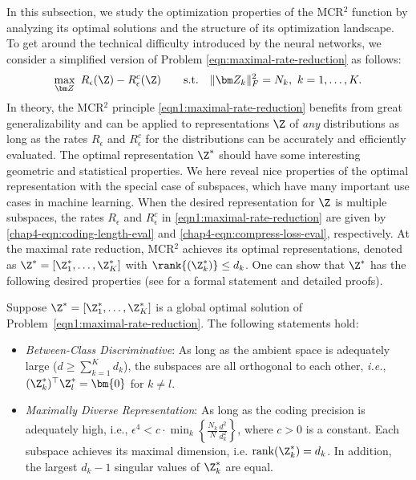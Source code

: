 \documentclass[../../book-main.tex]{subfiles}
\begin{document}
In this subsection, we study the optimization properties of the MCR$^2$ function by analyzing its optimal solutions and the structure of its optimization landscape. To get around the technical difficulty introduced by the neural networks, we consider a simplified version of Problem \eqref{eqn:maximal-rate-reduction} as follows: 
\begin{align}\label{eqn1:maximal-rate-reduction}
    \max_{\bm Z}\ R_{\epsilon}(\Z) - R_{\epsilon}^c(\Z)\qquad \mathrm{s.t.}\quad \|\bm Z_k\|_F^2 = N_k,\ k =1,\dots,K. 
\end{align}
In theory, the MCR$^2$ principle \eqref{eqn1:maximal-rate-reduction} benefits from great generalizability and can be applied to representations $\Z$ of {\em any} distributions  as long as the rates $R_\epsilon$ and $R^c_\epsilon$ for the distributions can be accurately and efficiently evaluated. The optimal representation $\Z^{\ast}$  should have some interesting geometric and statistical properties. We here reveal nice properties of the optimal representation with the special case of subspaces, which have many important use cases in machine learning. When the desired representation for $\Z$ is multiple subspaces, the rates $R_\epsilon$ and $R^c_\epsilon$ in \eqref{eqn1:maximal-rate-reduction} are given by \eqref{chap4-eqn:coding-length-eval}
and \eqref{chap4-eqn:compress-loss-eval}, respectively. At the maximal rate reduction, MCR$^2$ achieves its optimal representations, denoted as $\Z^{\ast} = [\Z_1^*,\dots,\Z_K^*]$ with $\rank{(\Z_{k}^*)}\le d_k$. One can show that $\Z^{\ast}$ has the following desired properties (see \cite{yu2020learning} for a formal statement and detailed proofs).

\begin{theorem}
	Suppose $\Z^{\ast} = [\Z_1^*,\dots,\Z_K^*]$ is a global optimal solution of Problem~\eqref{eqn1:maximal-rate-reduction}. The following statements hold: 
	\begin{itemize}
		\item {\em Between-Class Discriminative}: As long as the ambient space is adequately large ($d \ge \sum_{k=1}^{K} d_k$), the subspaces are all orthogonal to each other, {\em i.e.}, $(\Z_{k}^*)^{\top} \Z_{l}^* = \bm{0}$ for $k \not= l$.
		\item {\em Maximally Diverse Representation}:
		      As long as the coding precision is adequately high, i.e., $\epsilon ^4 < c\cdot \min_{k}\left\{ \frac{N_k}{N}\frac{d^2}{d_k^2}\right\}$, where $c>0$ is a constant. Each subspace achieves its maximal dimension, i.e. $\mathrm{rank}{(\Z_{k}^*)}= d_k$. In addition, the largest $d_k-1$ singular values of $\Z_{k}^*$ are equal.
		      \label{thm:MCR2-properties}
	\end{itemize}
\end{theorem}
\end{document}
